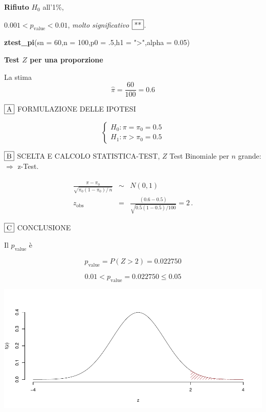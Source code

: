 \documentclass[
  11pt,
]{book}
\newenvironment{Shaded}{\begin{snugshade}}{\end{snugshade}}
\newcommand{\AttributeTok}[1]{\textcolor[rgb]{0.13,0.29,0.53}{#1}}
\newcommand{\DecValTok}[1]{\textcolor[rgb]{0.00,0.00,0.81}{#1}}
\newcommand{\FloatTok}[1]{\textcolor[rgb]{0.00,0.00,0.81}{#1}}
\newcommand{\FunctionTok}[1]{\textcolor[rgb]{0.13,0.29,0.53}{\textbf{#1}}}
\newcommand{\NormalTok}[1]{#1}
\newcommand{\StringTok}[1]{\textcolor[rgb]{0.31,0.60,0.02}{#1}}
\theoremstyle{mytheoremstyle}
\theoremstyle{mydefstyle}
\begin{document}
\textbf{Rifiuto} \(H_0\) all'1\%,

\(0.001<p_\text{value}<0.01\), \emph{molto significativo} \(\fbox{**}\).

\begin{Shaded}
\begin{Highlighting}[]
\FunctionTok{ztest\_pi}\NormalTok{(}\AttributeTok{sn =} \DecValTok{60}\NormalTok{,}\AttributeTok{n =} \DecValTok{100}\NormalTok{,}\AttributeTok{p0 =}\NormalTok{ .}\DecValTok{5}\NormalTok{,}\AttributeTok{h1 =} \StringTok{"\textgreater{}"}\NormalTok{,}\AttributeTok{alpha =} \FloatTok{0.05}\NormalTok{)}
\end{Highlighting}
\end{Shaded}

\textbf{Test \(Z\) per una proporzione}

La stima
\[\hat\pi=\frac { 60 } { 100 }= 0.6  \]

\(\fbox{A}\) FORMULAZIONE DELLE IPOTESI

\[\begin{cases}
   H_0: \pi = \pi_0=0.5 \\
   H_1: \pi > \pi_0=0.5 
   \end{cases}\]

\(\fbox{B}\) SCELTA E CALCOLO STATISTICA-TEST, \(Z\)
Test Binomiale per \(n\) grande: \(\Rightarrow\) z-Test.

\begin{eqnarray*}
   \frac{\hat\pi - \pi_{0}} {\sqrt {\pi_0(1-\pi_0)/\,n}}&\sim&N(0,1)\\
   z_{\text{obs}}
   &=& \frac{ ( 0.6 -  0.5 )} {\sqrt{ 0.5 (1- 0.5 )/ 100 }}
   =   2 \,.
   \end{eqnarray*}

\(\fbox{C}\) CONCLUSIONE

Il \(p_{\text{value}}\) è

\[ p_{\text{value}} = P(Z>2)=0.022750 \]

\[
 0.01 < p_\text{value}= 0.022750 \leq 0.05 
\]

\begin{center}\includegraphics{Appunti_di_Statistica_2025_files/figure-latex/25-test-functions-10-7} \end{center}
\end{document}
